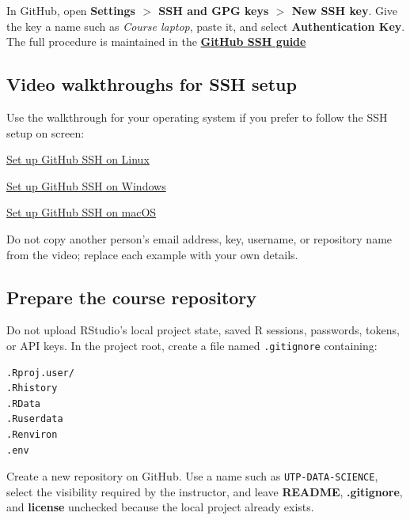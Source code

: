 In GitHub, open \textbf{Settings $>$ SSH and GPG keys $>$ New SSH key}. Give the
key a name such as \emph{Course laptop}, paste it, and select
\textbf{Authentication Key}. The full procedure is maintained in the
\href{https://docs.github.com/en/authentication/connecting-to-github-with-ssh}{\textbf{GitHub SSH guide}}

\subsection{Video walkthroughs for SSH setup}

Use the walkthrough for your operating system if you prefer to follow the SSH
setup on screen:

\begin{tcolorbox}[
  enhanced,
  breakable,
  colback=UTPPaleOrange,
  colframe=UTPOrange,
  colbacktitle=UTPOrange,
  boxrule=1pt,
  arc=2mm,
  title={Choose your operating system},
  fonttitle=\bfseries\color{white},
  left=3mm,right=3mm,top=2mm,bottom=2mm
]
\begin{description}[leftmargin=1.15in,style=nextline]
  \item[Linux]
    \href{https://youtu.be/AOM8CEyu3Ug?t=121}{Set up GitHub SSH on Linux}
  \item[Windows]
    \href{https://youtu.be/YT5YimhyX18?t=5}{Set up GitHub SSH on Windows}
  \item[macOS]
    \href{https://youtu.be/ACvE5Uy7ZB0?t=437}{Set up GitHub SSH on macOS}
\end{description}
\end{tcolorbox}

Do not copy another person's email address, key, username, or repository name from the video; replace each example with your own details.

\subsection{Prepare the course repository}

Do not upload RStudio's local project state, saved R sessions, passwords, tokens, or API keys. In the project root, create a file named \texttt{.gitignore} containing:

\begin{lstlisting}[style=mlterminal]
.Rproj.user/
.Rhistory
.RData
.Ruserdata
.Renviron
.env
\end{lstlisting}


Create a new repository on GitHub. Use a name such as
\texttt{UTP-DATA-SCIENCE}, select the visibility required by the
instructor, and leave \textbf{README}, \textbf{.gitignore}, and
\textbf{license} unchecked because the local project already exists.

